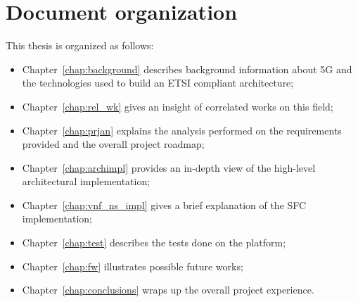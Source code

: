 \section*{Document organization}
 
This thesis is organized as follows:
\begin{itemize}
 \item Chapter~\ref{chap:background} describes background information about 5G
   and the technologies used to build an ETSI compliant architecture;
 \item Chapter~\ref{chap:rel_wk} gives an insight of correlated works on this
   field;
 \item Chapter~\ref{chap:prjan} explains the analysis performed on the
   requirements provided and the overall project roadmap;
 \item Chapter~\ref{chap:archimpl} provides an in-depth view of the high-level
   architectural implementation;
 \item Chapter~\ref{chap:vnf_ns_impl} gives a brief explanation of the SFC
   implementation;
 \item Chapter~\ref{chap:test} describes the tests done on the platform;
 \item Chapter~\ref{chap:fw} illustrates possible future works;
 \item Chapter~\ref{chap:conclusions} wraps up the overall project experience.
\end{itemize}
